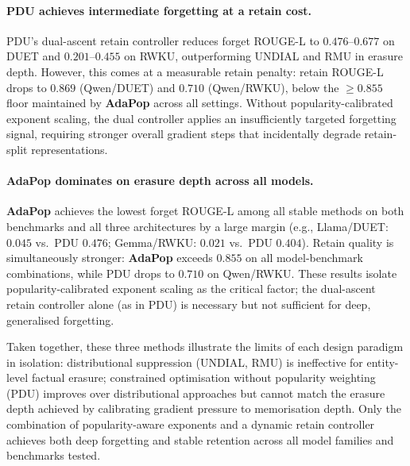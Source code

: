 \paragraph{PDU achieves intermediate forgetting at a retain cost.}
PDU's dual-ascent retain controller reduces forget ROUGE-L to $0.476$--$0.677$ on DUET and $0.201$--$0.455$ on RWKU, outperforming UNDIAL and RMU in erasure depth. However, this comes at a measurable retain penalty: retain ROUGE-L drops to $0.869$ (Qwen/DUET) and $0.710$ (Qwen/RWKU), below the $\geq 0.855$ floor maintained by \textbf{AdaPop} across all settings. Without popularity-calibrated exponent scaling, the dual controller applies an insufficiently targeted forgetting signal, requiring stronger overall gradient steps that incidentally degrade retain-split representations.

\paragraph{AdaPop dominates on erasure depth across all models.}
\textbf{AdaPop} achieves the lowest forget ROUGE-L among all stable methods on both benchmarks and all three architectures by a large margin (e.g., Llama/DUET: $0.045$ vs.\ PDU $0.476$; Gemma/RWKU: $0.021$ vs.\ PDU $0.404$). Retain quality is simultaneously stronger: \textbf{AdaPop} exceeds $0.855$ on all model-benchmark combinations, while PDU drops to $0.710$ on Qwen/RWKU. These results isolate popularity-calibrated exponent scaling as the critical factor; the dual-ascent retain controller alone (as in PDU) is necessary but not sufficient for deep, generalised forgetting.

Taken together, these three methods illustrate the limits of each design paradigm in isolation: distributional suppression (UNDIAL, RMU) is ineffective for entity-level factual erasure; constrained optimisation without popularity weighting (PDU) improves over distributional approaches but cannot match the erasure depth achieved by calibrating gradient pressure to memorisation depth. Only the combination of popularity-aware exponents and a dynamic retain controller achieves both deep forgetting and stable retention across all model families and benchmarks tested.

